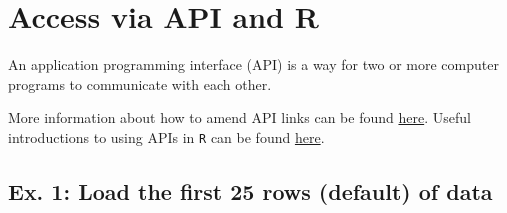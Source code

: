\documentclass[
  letterpaper,
  oneside,
  open=any]{scrbook}
\begin{document}
\hypertarget{access-via-api-and-r}{%
\chapter{Access via API and R}\label{access-via-api-and-r}}

An application programming interface (API) is a way for two or more
computer programs to communicate with each other.

More information about how to amend API links can be found
\href{https://docs.oracle.com/en/database/oracle/oracle-rest-data-services/22.3/books.html\#AELIG90103/}{here}.
Useful introductions to using APIs in \texttt{R} can be found
\href{https://www.dataquest.io/blog/r-api-tutorial/}{here}.

\hypertarget{ex.-1-load-the-first-25-rows-default-of-data}{%
\section{Ex. 1: Load the first 25 rows (default) of
data}\label{ex.-1-load-the-first-25-rows-default-of-data}}
\end{document}
